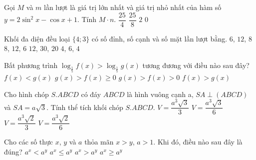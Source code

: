 \begin{ex}%
Gọi $M$ và $m$ lần lượt là giá trị lớn nhất và giá trị nhỏ nhất của hàm số $y=2\sin^2 x -\cos x+1$. Tính $M\cdot n$.
\choice
{$\dfrac{25}{4}$}
{$\dfrac{25}{8}$}
{$2$}
{\True $0$}
\end{ex}

\begin{ex}%
Khối đa diện đều loại $\{4;3\}$ có số đỉnh, số cạnh và số mặt lần lượt bằng.
\choice
{$6$, $12$, $8$}
{\True $8$, $12$, $6$}
{$12$, $30$, $20$}
{$4$, $6$, $4$}
\end{ex}

\begin{ex}%
Bất phương trình $\log_{\frac{1}{5}} f(x)> \log_{\frac{1}{5}} g(x)$ tương đương với điều nào sau đây?
\choice
{$f(x)<g(x)$}
{$g(x)>f(x)\ge 0$}
{\True $g(x)>f(x)>0$}
{$f(x)>g(x)$}
\end{ex}

\begin{ex}%
Cho hình chóp $S.ABCD$ có đáy $ABCD$ là hình vuông cạnh a, $SA\perp (ABCD)$ và $SA=a\sqrt{3}$. Tính thể tích khối chóp $S.ABCD$.
\choice
{\True $V=\dfrac{a^3\sqrt{3}}{3}$}
{$V=\dfrac{a^3 \sqrt{3}}{6}$}
{$V=\dfrac{a^3\sqrt{2}}{3}$}
{$V=\dfrac{a^3\sqrt{2}}{6}$}
\end{ex}

\begin{ex}%
Cho các số thực $x$, $y$ và $a$ thỏa mãn $x>y$, $a>1$. Khi đó, điều nào sau đây là đúng?
\choice
{$a^x<a^y$}
{$a^x\le a^y$}
{\True $a^x > a^y$}
{$a^x \ge a^y$}
\end{ex}

